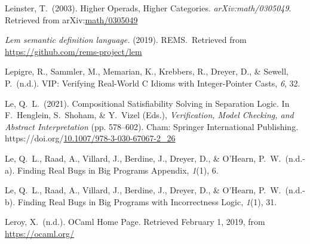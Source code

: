 \documentclass[12pt,twoside]{article}
\begin{document}
{\begin{thebibliography}{1079}
\mdbibitemlabel{}Leinster, T.~(2003). Higher Operads, Higher Categories. \emph{arXiv:math/0305049}. Retrieved from arXiv:\href{http://arxiv.org/abs/math/0305049}{math/0305049}%

\mdbibitemlabel{}\emph{Lem semantic definition language.} (2019). REMS.~Retrieved from \href{https://github.com/rems-project/lem}{{\ttfamily https://\hspace{0pt}github.\hspace{0pt}com/\hspace{0pt}rems-\hspace{0pt}project/\hspace{0pt}lem}}%

\mdbibitemlabel{}Lepigre, R., Sammler, M., Memarian, K., Krebbers, R., Dreyer, D., \& Sewell, P.~(n.d.). VIP: Verifying Real-World C Idioms with Integer-Pointer Casts, \emph{6}, 32.%

\mdbibitemlabel{}Le, Q.~L.~(2021). Compositional Satisfiability Solving in Separation Logic. In F.~Henglein, S.~Shoham, \& Y.~Vizel (Eds.), \emph{Verification, Model Checking, and Abstract Interpretation} (pp. 578–602). Cham: Springer International Publishing. https://doi.org/\href{https://dx.doi.org/10.1007/978-3-030-67067-2_26}{10.1007/978-3-030-67067-2\_26}%

\mdbibitemlabel{}Le, Q.~L., Raad, A., Villard, J., Berdine, J., Dreyer, D., \& O’Hearn, P.~W.~(n.d.-a). Finding Real Bugs in Big Programs Appendix, \emph{1}(1), 6.%

\mdbibitemlabel{}Le, Q.~L., Raad, A., Villard, J., Berdine, J., Dreyer, D., \& O’Hearn, P.~W.~(n.d.-b). Finding Real Bugs in Big Programs with Incorrectness Logic, \emph{1}(1), 31.%

\mdbibitemlabel{}Leroy, X.~(n.d.). OCaml Home Page. Retrieved February 1, 2019, from \href{https://ocaml.org/}{{\ttfamily https://\hspace{0pt}ocaml.\hspace{0pt}org/\hspace{0pt}}}%


\end{thebibliography}}
\end{document}
